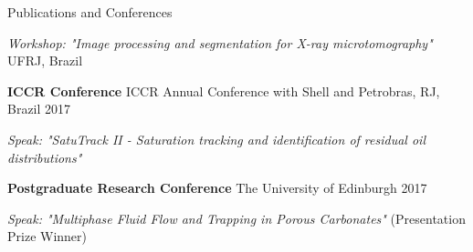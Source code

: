 \documentclass{resume} %
\newenvironment{indentpar}[1]%
  {\begin{list}{}%
          {\setlength{\leftmargin}{#1}}%
          \item[]%
  }
  {\end{list}}
\begin{document}
\begin{rSection}{Publications and Conferences}
\begin{indentpar}{0.5cm}
\begin{indentpar}{0.5cm}
\textit {Workshop: "Image processing and segmentation for X-ray microtomography"} UFRJ, Brazil
\end{indentpar}

\textbf{ICCR Conference} ICCR Annual Conference with Shell and Petrobras, RJ, Brazil \hfill {2017}
\begin{indentpar}{0.5cm}
\textit {Speak: "SatuTrack II - Saturation tracking and identification of residual oil distributions"}
\end{indentpar}

\textbf{Postgraduate Research Conference} The University of Edinburgh \hfill {2017} 
\begin{indentpar}{0.5cm}
\textit {Speak: "Multiphase Fluid Flow and Trapping in Porous Carbonates"} (Presentation Prize Winner)
\end{indentpar}
\end{indentpar}
\end{rSection}
\end{document}
